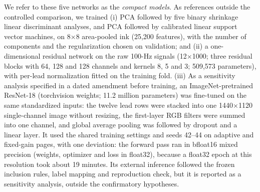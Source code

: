 \documentclass{wlscirep}
\begin{document}
We refer to these five networks as the \emph{compact models}. As references outside the controlled comparison, we trained (i) PCA followed by five binary shrinkage linear discriminant analyses, and PCA followed by calibrated linear support vector machines, on 8$\times$8 area-pooled ink (25{,}200 features), with the number of components and the regularization chosen on validation; and (ii) a one-dimensional residual network \cite{wang2017timeseries,he2016resnet} on the raw 100-Hz signals (12$\times$1000; three residual blocks with 64, 128 and 128 channels and kernels 8, 5 and 3; 509{,}573 parameters), with per-lead normalization fitted on the training fold. (iii) As a sensitivity analysis specified in a dated amendment before training, an ImageNet-pretrained ResNet-18 \cite{he2016resnet} (torchvision weights; 11.2 million parameters) was fine-tuned on the same standardized inputs: the twelve lead rows were stacked into one 1440$\times$1120 single-channel image without resizing, the first-layer RGB filters were summed into one channel, and global average pooling was followed by dropout and a linear layer. It used the shared training settings and seeds 42--44 on adaptive and fixed-gain pages, with one deviation: the forward pass ran in bfloat16 mixed precision (weights, optimizer and loss in float32), because a float32 epoch at this resolution took about 19 minutes. Its external inference followed the frozen inclusion rules, label mapping and reproduction check, but it is reported as a sensitivity analysis, outside the confirmatory hypotheses.
\end{document}
